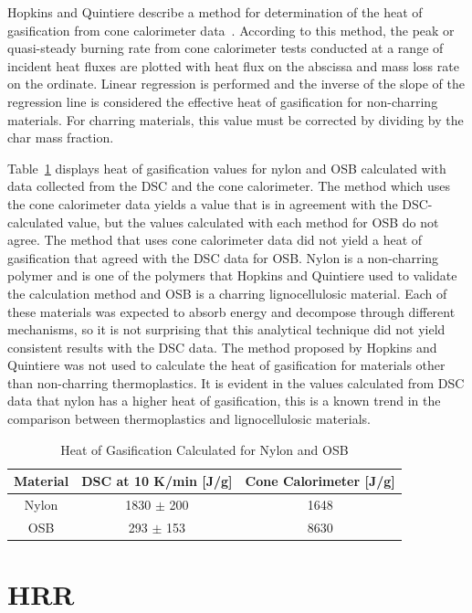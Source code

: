 \documentclass[12pt,oneside]{book}
\begin{document}
Hopkins and Quintiere describe a method for determination of the heat of gasification from cone calorimeter data~\cite{Hopkins_1996}. According to this method, the peak or quasi-steady burning rate from cone calorimeter tests conducted at a range of incident heat fluxes are plotted with heat flux on the abscissa and mass loss rate on the ordinate. Linear regression is performed and the inverse of the slope of the regression line is considered the effective heat of gasification for non-charring materials. For charring materials, this value must be corrected by dividing by the char mass fraction.

Table~\ref{tab:hog} displays heat of gasification values for nylon and OSB calculated with data collected from the DSC and the cone calorimeter. The method which uses the cone calorimeter data yields a value that is in agreement with the DSC-calculated value, but the values calculated with each method for OSB do not agree. The method that uses cone calorimeter data did not yield a heat of gasification that agreed with the DSC data for OSB. Nylon is a non-charring polymer and is one of the polymers that Hopkins and Quintiere used to validate the calculation method and OSB is a charring lignocellulosic material. Each of these materials was expected to absorb energy and decompose through different mechanisms, so it is not surprising that this analytical technique did not yield consistent results with the DSC data. The method proposed by Hopkins and Quintiere was not used to calculate the heat of gasification for materials other than non-charring thermoplastics. It is evident in the values calculated from DSC data that nylon has a higher heat of gasification, this is a known trend in the comparison between thermoplastics and lignocellulosic materials.

\begin{table}[!ht]{}
\centering
\caption[Heat of Gasification Calculated for Nylon and OSB]{Heat of Gasification Calculated for Nylon and OSB}
{\begin{tabular}{ccc}
\toprule
Material 		& DSC at 10 K/min [J/g]	& Cone Calorimeter [J/g] \\
\midrule
Nylon 			& 1830 $\pm$ 200		& 1648 \\
OSB				& 293 $\pm$ 153			& 8630   \\  
\bottomrule
\end{tabular}}
\label{tab:hog}
\end{table}

\section{HRR}
\end{document}
